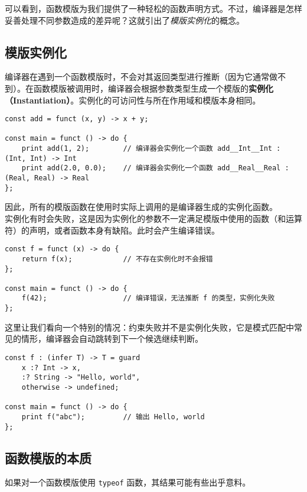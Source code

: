 可以看到，函数模版为我们提供了一种轻松的函数声明方式。不过，编译器是怎样妥善处理不同参数造成的差异呢？这就引出了\emph{模版实例化}的概念。

\subsection{模版实例化}

编译器在遇到一个函数模版时，不会对其返回类型进行推断（因为它通常做不到）。在函数模版被调用时，编译器会根据参数类型生成一个模版的\textbf{实例化（Instantiation）}。实例化的可访问性与所在作用域和模版本身相同。

\begin{lstlisting}
const add = funct (x, y) -> x + y;

const main = funct () -> do {
	print add(1, 2);		// 编译器会实例化一个函数 add__Int__Int : (Int, Int) -> Int
	print add(2.0, 0.0);	// 编译器会实例化一个函数 add__Real__Real : (Real, Real) -> Real
};
\end{lstlisting}

因此，所有的模版函数在使用时实际上调用的是编译器生成的实例化函数。 \\

实例化有时会失败，这是因为实例化的参数不一定满足模版中使用的函数（和运算符）的声明，或者函数本身有缺陷。此时会产生编译错误。

\begin{lstlisting}
const f = funct (x) -> do {
	return f(x);			// 不存在实例化时不会报错
};

const main = funct () -> do {
	f(42);					// 编译错误，无法推断 f 的类型，实例化失败
};
\end{lstlisting}

这里让我们看向一个特别的情况：约束失败并不是实例化失败，它是模式匹配中常见的情形，编译器会自动跳转到下一个候选继续判断。

\begin{lstlisting}
const f : (infer T) -> T = guard
	x :? Int -> x,
	:? String -> "Hello, world",
	otherwise -> undefined;
	
const main = funct () -> do {
	print f("abc");			// 输出 Hello, world
};
\end{lstlisting}

\subsection{函数模版的本质}

如果对一个函数模版使用 \lstinline!typeof! 函数，其结果可能有些出乎意料。

